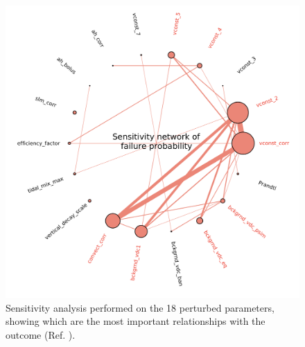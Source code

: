 \documentclass[english,notitlepage,reprint,nofootinbib]{revtex4-1}  %
\begin{document}
\begin{figure}[h]
    \centering 
    \includegraphics[scale=0.28]{dataset/sensitivity.png}
    \caption{Sensitivity analysis performed on the 18 perturbed parameters, showing which are the most important relationships with the outcome (Ref. \cite{failure}).}
    \label{data:sens}
\end{figure}
\end{document}
